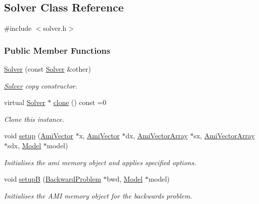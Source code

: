 \hypertarget{classamici_1_1_solver}{}\subsection{Solver Class Reference}
\label{classamici_1_1_solver}


{\ttfamily \#include $<$solver.\+h$>$}

\subsubsection*{Public Member Functions}
\begin{DoxyCompactItemize}
\item 
\mbox{\hyperlink{classamici_1_1_solver_a4676b699f5efede8bee51636bbe8b54a}{Solver}} (const \mbox{\hyperlink{classamici_1_1_solver}{Solver}} \&other)
\begin{DoxyCompactList}\small\item\em \mbox{\hyperlink{classamici_1_1_solver}{Solver}} copy constructor. \end{DoxyCompactList}\item 
virtual \mbox{\hyperlink{classamici_1_1_solver}{Solver}} $\ast$ \mbox{\hyperlink{classamici_1_1_solver_ad40c0e06f5ee35afc1dd60e9f80ac5be}{clone}} () const =0
\begin{DoxyCompactList}\small\item\em Clone this instance. \end{DoxyCompactList}\item 
void \mbox{\hyperlink{classamici_1_1_solver_a5cffde567803181ec12c71117c74b47a}{setup}} (\mbox{\hyperlink{classamici_1_1_ami_vector}{Ami\+Vector}} $\ast$x, \mbox{\hyperlink{classamici_1_1_ami_vector}{Ami\+Vector}} $\ast$dx, \mbox{\hyperlink{classamici_1_1_ami_vector_array}{Ami\+Vector\+Array}} $\ast$sx, \mbox{\hyperlink{classamici_1_1_ami_vector_array}{Ami\+Vector\+Array}} $\ast$sdx, \mbox{\hyperlink{classamici_1_1_model}{Model}} $\ast$model)
\begin{DoxyCompactList}\small\item\em Initialises the ami memory object and applies specified options. \end{DoxyCompactList}\item 
void \mbox{\hyperlink{classamici_1_1_solver_ad053924ece01f2958b5bc2332f56a0d6}{setupB}} (\mbox{\hyperlink{classamici_1_1_backward_problem}{Backward\+Problem}} $\ast$bwd, \mbox{\hyperlink{classamici_1_1_model}{Model}} $\ast$model)
\begin{DoxyCompactList}\small\item\em Initialises the A\+MI memory object for the backwards problem. \end{DoxyCompactList}\item 

\end{DoxyCompactItemize}
